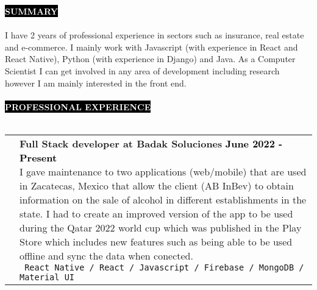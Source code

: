 \documentclass[11pt,A4]{article}
\makeatletter
\newcounter{a}
\newcounter{b}
\newcounter{c}
\newcommand{\cvsection}[1] {
  \textcolor{white}{\MakeUppercase{\textbf{#1}}}
}
\newcommand{\cvsect}[1]{
  \colorbox{black}{{\cvsection{#1}}}\\ \\%
}
\newenvironment{entrylist}{%
  \begin{tabular*}{\textwidth}[t]{@{\extracolsep{\fill}}ll}
  }{%
  \end{tabular*}
}
\newcommand{\entry}[5]{%
  &\parbox[t]{17.5cm}{%
    \large\textbf{#1}%
    \hfill
    {\small \textbf{\textcolor{black}{#2}}}\\%
    \normalsize #4\\
    \texttt{#5}
  }\\\\}
\newcommand{\slashsep}{
  \hspace{1mm}/\hspace{1mm}
}
\makeatother
\begin{document}
\cvsect{Summary} 
  I have 2 years of professional experience in sectors such as insurance, real estate and e-commerce. I mainly work with Javascript (with experience in React and React Native), Python (with experience in Django) and Java. As a Computer Scientist I can get involved in any area of development including research however I am mainly interested in the front end. \\
  \\
  \cvsect{Professional Experience}
  \begin{entrylist}
    \entry
    {Full Stack developer at Badak Soluciones}
    {June 2022 - Present}
    {AB InBev}
    {I gave maintenance to two applications (web/mobile) that are used in Zacatecas, Mexico that allow the client (AB InBev) to obtain information on the sale of alcohol in different establishments in the state. I had to create an improved version of the app to be used during the Qatar 2022 world cup which was published in the Play Store which includes new features such as being able to be used offline and sync the data when conected.}
    { React Native \slashsep React \slashsep Javascript \slashsep Firebase \slashsep MongoDB \slashsep Material UI}
    \entry
    {Front end developer at GNP Seguros}
    {April 2021 - February 2022}
    {GNP Seguros}
    {UI for an insurance company where agents can fill all data required for several types of insurances based on their client's needs to get the cost and try to make an offer.}
    { React \slashsep Javascript \slashsep Redux \slashsep Material UI \slashsep Team Management}
    \entry
    {Full stack developer at M22}
    {October 2020 - February 2021}
    {M22}
    {UI for a real estate company where people can view details and availability of several places for make purchase agreement. All the data updates in real time and the content is modified from a Content Management System(CMS).}
    {React \slashsep Javascript \slashsep Strapi JS \slashsep QGIS \slashsep GraphQL \slashsep PostgreSQL}
    \entry
    {Full stack developer at Ultra maratón sierra mixe}
    {January 2020 - September 2020}
    {Ultra maratón sierra mixe}
    {This is a client's project on the automation of the processes involved in the realization of a marathon race such as registration, marketing and payment.}
    { React \slashsep Javascript \slashsep Google Firebase \slashsep Bootstrap}
  \end{entrylist}
\end{document}
